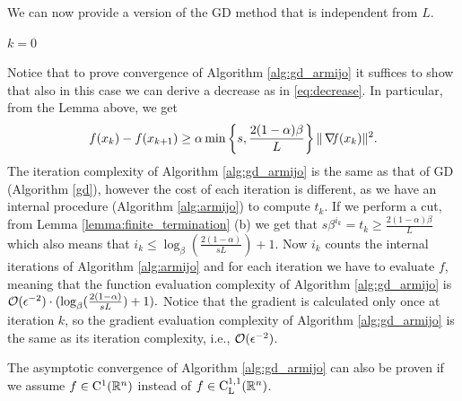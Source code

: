 \documentclass[10pt,a4paper]{article}
\begin{document}
\noindent We can now provide a version of the GD method that is independent from $L$.\\
\begin{algorithm}[H]\label{alg:gd_armijo}
	\caption{Gradient Descent (GD) Method with Armijo Line Search}
	
	
	$k = 0$
	
\end{algorithm}
\noindent Notice that to prove convergence of Algorithm \ref{alg:gd_armijo} it suffices to show that also in this case we can derive a decrease as in \eqref{eq:decrease}. In particular, from the Lemma above, we get
\begin{equation*}
	f(x_k) - f(x_{k+1}) \geq \alpha  \min \left \{s, \frac{2(1-\alpha)\beta}{L} \right \} \| \operatorname*{\mathit{\nabla \!f}}(x_k)\|^2.
\end{equation*}
The iteration complexity of Algorithm \ref{alg:gd_armijo} is the same as that of GD (Algorithm \ref{gd}), however the cost of each iteration is different, as we have an internal procedure (Algorithm \ref{alg:armijo}) to compute $t_k$. If we perform a cut, from Lemma \ref{lemma:finite_termination} (b) we get that  $s\beta^{i_k}=t_k \geq \frac{2(1-\alpha)\beta}{L}$ which also means that $i_k\leq \log_\beta (\frac{2(1-\alpha)}{sL}) + 1$. Now $i_k$ counts the internal iterations of Algorithm \ref{alg:armijo} and for each iteration we have to evaluate $f$, meaning that the function evaluation complexity of Algorithm \ref{alg:gd_armijo} is $\mathcal{O}(\epsilon^{-2})\cdot (\log_\beta (\frac{2(1-\alpha)}{sL}) + 1).$ Notice that the gradient is calculated only once at iteration $k$, so the gradient evaluation complexity of Algorithm \ref{alg:gd_armijo} is the same as its iteration complexity, i.e., $\mathcal{O}(\epsilon^{-2})$.\\
\par The asymptotic convergence of Algorithm \ref{alg:gd_armijo} can also be proven if we assume $f\in \mathord{\mathrm{C^1}}(\mathbb{R}^n)$ instead of $f\in \mathord{\mathrm{C^{1,1}_{L}}}(\mathbb{R}^n)$.
\end{document}
